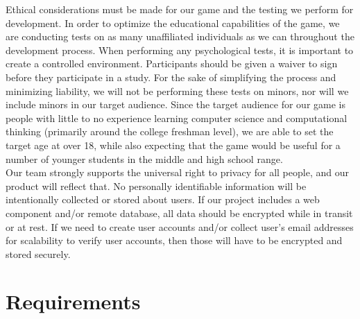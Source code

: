 \documentclass{article}
\begin{document}
Ethical considerations must be made for our game and the testing we perform for
development. In order to optimize the educational capabilities of the game, we
are conducting tests on as many unaffiliated individuals as we can throughout
the development process. When performing any psychological tests, it is
important to create a controlled environment. Participants should be given a
waiver to sign before they participate in a study. For the sake of simplifying
the process and minimizing liability, we will not be performing these tests on
minors, nor will we include minors in our target audience. Since the target
audience for our game is people with little to no experience learning computer
science and computational thinking (primarily around the college freshman
level), we are able to set the target age at over 18, while also expecting that
the game would be useful for a number of younger students in the middle and high
school range.\\

Our team strongly supports the universal right to privacy for all people, and
our product will reflect that. No personally identifiable information will be
intentionally collected or stored about users. If our project includes a web
component and/or remote database, all data should be encrypted while in transit
or at rest. If we need to create user accounts and/or collect user’s email
addresses for scalability to verify user accounts, then those will have to be
encrypted and stored securely.

\newpage
\section{Requirements}
\end{document}
